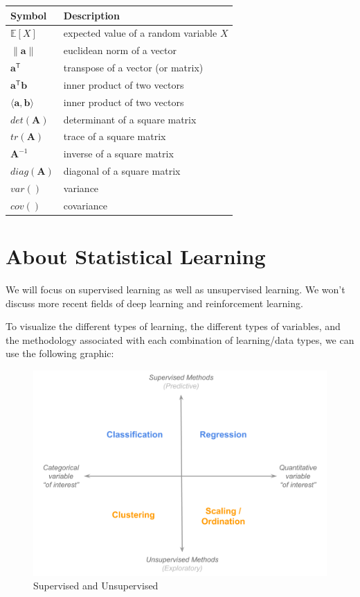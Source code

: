 \documentclass[]{book}
\begin{document}
\begin{longtable}[]{@{}ll@{}}
\toprule
Symbol & Description\tabularnewline
\midrule
\endhead
\(\mathbb{E}[X]\) & expected value of a random variable \(X\)\tabularnewline
\(\|\mathbf{a}\|\) & euclidean norm of a vector\tabularnewline
\(\mathbf{a}^{\mathsf{T}}\) & transpose of a vector (or matrix)\tabularnewline
\(\mathbf{a^{\mathsf{T}}b}\) & inner product of two vectors\tabularnewline
\(\langle \mathbf{a}, \mathbf{b} \rangle\) & inner product of two vectors\tabularnewline
\(det(\mathbf{A})\) & determinant of a square matrix\tabularnewline
\(tr(\mathbf{A})\) & trace of a square matrix\tabularnewline
\(\mathbf{A}^{-1}\) & inverse of a square matrix\tabularnewline
\(diag(\mathbf{A})\) & diagonal of a square matrix\tabularnewline
\(var()\) & variance\tabularnewline
\(cov()\) & covariance\tabularnewline
\bottomrule
\end{longtable}

\hypertarget{about-statistical-learning}{%
\section{About Statistical Learning}\label{about-statistical-learning}}

We will focus on supervised learning as well as unsupervised learning.
We won't discuss more recent fields of deep learning and reinforcement learning.

To visualize the different types of learning, the different types of variables, and the methodology associated with each combination of learning/data types, we can use the following graphic:

\begin{figure}

{\centering \includegraphics[width=0.8\linewidth]{images/introduction/four_corners} 

}

\caption{Supervised and Unsupervised}\label{fig:unnamed-chunk-5}
\end{figure}
\end{document}
